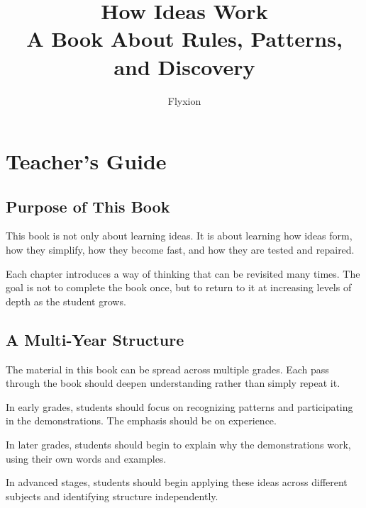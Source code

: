 \documentclass[12pt]{book}
\title{\textbf{How Ideas Work}\\[6pt]
\large A Book About Rules, Patterns, and Discovery}
\author{Flyxion}
\date{}
\begin{document}

\maketitle
\tableofcontents

\chapter*{Teacher's Guide}

\section*{Purpose of This Book}

This book is not only about learning ideas. It is about learning how ideas
form, how they simplify, how they become fast, and how they are tested
and repaired.

Each chapter introduces a way of thinking that can be revisited many times.
The goal is not to complete the book once, but to return to it at increasing
levels of depth as the student grows.

\section*{A Multi-Year Structure}

The material in this book can be spread across multiple grades. Each pass
through the book should deepen understanding rather than simply repeat it.

In early grades, students should focus on recognizing patterns and
participating in the demonstrations. The emphasis should be on experience.

In later grades, students should begin to explain why the demonstrations
work, using their own words and examples.

In advanced stages, students should begin applying these ideas across
different subjects and identifying structure independently.
\end{document}
